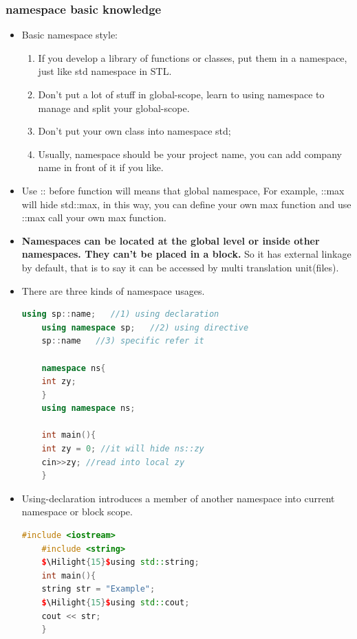 \documentclass[a4paper,11pt,twoside]{book}
\newcommand{\Hilight}[1]{\makebox[0pt][l]{\color{yellow}\rule[-3pt]{#1em}{11pt}}}
\newcommand{\Hilight}[1]{}
\begin{document}
\subsubsection{namespace basic knowledge}
\begin{itemize}
	\item Basic namespace style:
	\begin{enumerate}
		\item If you develop a library of functions or classes, put them in a namespace, just like std namespace in STL.
		
		\item Don't put a lot of stuff in global-scope, learn to using namespace to manage and split your global-scope. 
		
		\item Don't put your own class into namespace std;
		
		\item Usually, namespace should be your project name, you can add company name in front of it if you like.
	\end{enumerate}
	
	
	\item Use :: before function will means that global namespace, For example, ::max will hide std::max, in this way, you can define your own max function and use ::max call your own max function. 
	
	\item \textbf{ Namespaces can be located at the global level or inside other namespaces. They can't be placed in a block.} So it has external linkage by default, that is to say it can be accessed by multi translation unit(files).
	
	
	\item There are three kinds of namespace usages.
	\begin{lstlisting}[frame=single, language=c++]
	using sp::name;   //1) using declaration
	using namespace sp;   //2) using directive
	sp::name   //3) specific refer it
	
	namespace ns{
	int zy;
	}
	using namespace ns;
	
	int main(){
	int zy = 0; //it will hide ns::zy
	cin>>zy; //read into local zy
	}
	\end{lstlisting}
	
	\item Using-declaration introduces a member of another namespace into current namespace or block scope.
	
	\begin{lstlisting}[frame=single, language=c++, mathescape=true]
	#include <iostream>
	#include <string>
	$\Hilight{15}$using std::string;
	int main(){
	string str = "Example";
	$\Hilight{15}$using std::cout;
	cout << str;
	}
	\end{lstlisting}
	

\end{itemize}
\end{document}
